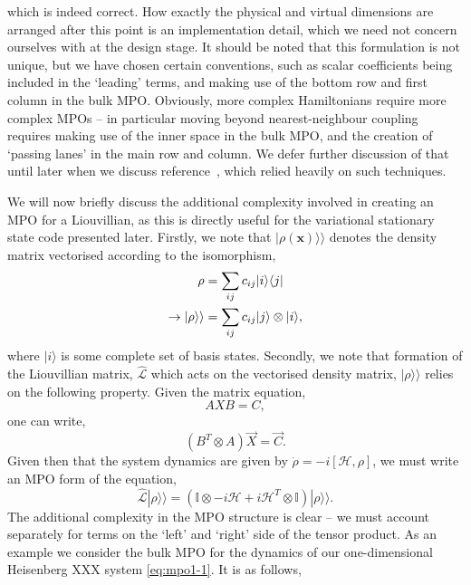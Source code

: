  which is indeed correct. How exactly the physical and virtual dimensions are arranged after this point is an implementation detail, which we need not concern ourselves with at the design stage. It should be noted that this formulation is not unique, but we have chosen certain conventions, such as scalar coefficients being included in the `leading' terms, and making use of the bottom row and first column in the bulk MPO. Obviously, more complex Hamiltonians require more complex MPOs -- in particular moving beyond nearest-neighbour coupling requires making use of the inner space in the bulk MPO, and the creation of `passing lanes' in the main row and column. We defer further discussion of that until later when we discuss reference~\cite{Owen2017}, which relied heavily on such techniques.

 We will now briefly discuss the additional complexity involved in creating an MPO for a Liouvillian, as this is directly useful for the variational stationary state code presented later. Firstly, we note that \(|\rho (\mathbf{x}) \rangle \rangle\) denotes the density matrix vectorised according to the isomorphism,
\begin{align}
\rho &= \sum_{ij} c_{ij} |i \rangle \langle j| \notag \\
\rightarrow | \rho \rangle \rangle &= \sum_{ij} c_{ij} |j \rangle \otimes |i \rangle,
\label{eq:vs1-11}
\end{align}
where \(|i\rangle\) is some complete set of basis states. Secondly, we note that formation of the Liouvillian matrix, \(\hat{\mathcal{L}}\) which acts on the vectorised density matrix, \(|\rho \rangle \rangle\) relies on the following property. Given the matrix equation,
 \begin{equation}
 	AXB = C,
 	\label{eq:mpo1-6}
 \end{equation}
 one can write,
 \begin{equation}
 	(B^{T} \otimes A)\vec{X} = \vec{C}.
 	\label{eq:mpo1-7}
 \end{equation}
 Given then that the system dynamics are given by \(\dot{\rho} = -i[\mathcal{H}, \rho]\), we must write an MPO form of the equation,
 \begin{equation}
 	\hat{\mathcal{L}}|\rho \rangle \rangle = \left( \mathbb{I} \otimes -i\mathcal{H} + i\mathcal{H}^{T} \otimes \mathbb{I} \right)| \rho \rangle \rangle.
 	\label{eq:mpo1-8}
 \end{equation}
 The additional complexity in the MPO structure is clear -- we must account separately for terms on the `left' and `right' side of the tensor product. As an example we consider the bulk MPO for the dynamics of our one-dimensional Heisenberg XXX system \cref{eq:mpo1-1}. It is as follows,
